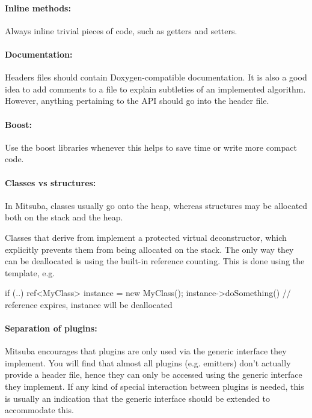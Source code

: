 \paragraph{Inline methods:} Always inline trivial pieces of code, such
as getters and setters.
\paragraph{Documentation:} Headers files should contain
Doxygen-compatible documentation. It is also a good idea to add
comments to a  file to explain subtleties of an implemented algorithm.
However, anything pertaining to the API should go into the header file.

\paragraph{Boost:} Use the boost libraries whenever this helps to save
time or write more compact code.

\paragraph{Classes vs structures:}In Mitsuba, classes usually go onto the heap,
whereas structures may be allocated both on the stack and the heap.

Classes that derive from  implement a protected virtual
deconstructor, which explicitly prevents them from being allocated on the stack.
The only way they can be deallocated is using the built-in reference
counting. This is done using the  template, e.g.

\begin{cpp}
if (..) {
    ref<MyClass> instance = new MyClass();
    instance->doSomething()
}   // reference expires, instance will be deallocated
\end{cpp}

\paragraph{Separation of plugins:}Mitsuba encourages that plugins are only
used via the generic interface they implement. You will find that almost all plugins
(e.g. emitters) don't actually provide a header file, hence they can only be accessed
using the generic  interface they implement. If any kind of special
interaction between plugins is needed, this is usually an indication that the
generic interface should be extended to accommodate this.
